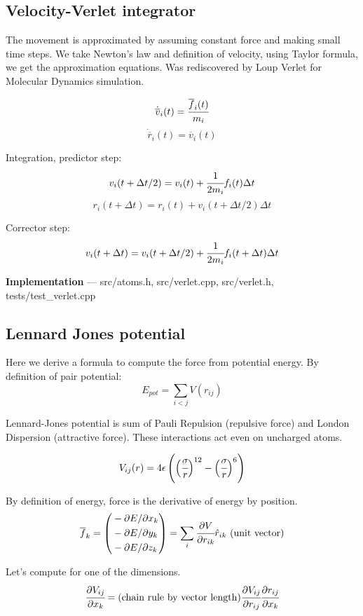 \documentclass[12pt,a4paper]{article}
\newcommand{\mat}[1]{\overline{#1}}
\begin{document}
\newpage
\subsection*{Velocity-Verlet integrator}

The movement is approximated by assuming constant force and making small time steps. We take Newton's law and definition of velocity, using Taylor formula, we get the approximation equations. Was rediscovered by Loup Verlet \cite{verlet} for Molecular Dynamics simulation.

\[ \dot{\mat{v}}_i(t) = \cfrac{\mat{f}_i(t)}{m_i} \]
\[ \dot{\mat{r}}_i(t) = \mat{v}_i(t) \]

Integration, predictor step:
\[
v_i(t + \Delta t/2) = v_i(t) + \cfrac{1}{2m_i} f_i(t) \Delta t
\]
\[ r_i(t+\Delta t) = r_i(t) + v_i(t+ \Delta t/2) \Delta t \]

Corrector step:
\[ v_i(t+\Delta t) = v_i(t+\Delta t/2) + \cfrac{1}{2m_i}f_i(t+\Delta t) \Delta t \]

{\bf Implementation} --- src/atoms.h, src/verlet.cpp, src/verlet.h, tests/test\_verlet.cpp

\subsection*{Lennard Jones potential}

Here we derive a formula to compute the force from potential energy. By definition of pair potential:
\[
E_{pot} = \sum_{i<j} V(r_{ij})
\]

Lennard-Jones potential \cite{lennard-jones} is sum of Pauli Repulsion (repulsive force) and London Dispersion (attractive force). These interactions act even on uncharged atoms.

\[
V_{ij}(r) = 4\epsilon \left( \Bigl(\cfrac{\sigma}{r}\Bigr)^{12} - \Bigl(\cfrac{\sigma}{r}\Bigr)^{6} \right)
\]

By definition of energy, force is the derivative of energy by position.
\[
\mat{f}_k = \left( \begin{aligned}
	& - \partial E / \partial x_k \\
	& - \partial E / \partial y_k \\
	& - \partial E / \partial z_k \\
\end{aligned} \right) = \sum_i \cfrac{\partial V}{\partial r_{ik}} {\hat r_{ik}} \text{\ (unit vector)}
\]

Let's compute for one of the dimensions.
\[
\cfrac{\partial V_{ij}}{\partial x_k} = \text{(chain rule by vector length)} \cfrac{\partial V_{ij}}{\partial r_{ij}} \cfrac{\partial r_{ij}}{\partial x_k}
\]
\end{document}
